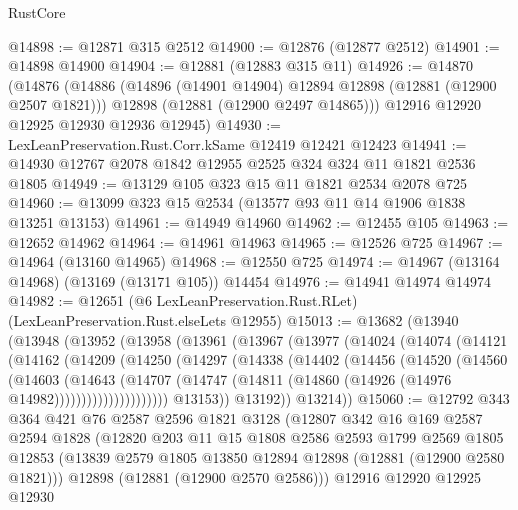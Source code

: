 \begin{lexlean}{RustCore}
\begin{coremodule}
@14898 := @12871 @315 @2512
@14900 := @12876 (@12877 @2512)
@14901 := @14898 @14900
@14904 := @12881 (@12883 @315 @11)
@14926 := @14870
    (@14876
      (@14886
        (@14896 (@14901 @14904) @12894 @12898 (@12881 (@12900 @2507 @1821)))
        @12898
        (@12881 (@12900 @2497 @14865)))
      @12916
      @12920
      @12925
      @12930
      @12936
      @12945)
@14930 := LexLeanPreservation.Rust.Corr.kSame @12419 @12421 @12423
@14941 := @14930 @12767 @2078 @1842 @12955 @2525 @324 @324 @11 @1821 @2536 @1805
@14949 := @13129 @105 @323 @15 @11 @1821 @2534 @2078 @725
@14960 := @13099 @323 @15 @2534 (@13577 @93 @11 @14 @1906 @1838 @13251 @13153)
@14961 := @14949 @14960
@14962 := @12455 @105
@14963 := @12652 @14962
@14964 := @14961 @14963
@14965 := @12526 @725
@14967 := @14964 (@13160 @14965)
@14968 := @12550 @725
@14974 := @14967 (@13164 @14968) (@13169 (@13171 @105)) @14454
@14976 := @14941 @14974 @14974
@14982 := @12651 (@6 LexLeanPreservation.Rust.RLet) (LexLeanPreservation.Rust.elseLets @12955)
@15013 := @13682
    (@13940
      (@13948
        (@13952
          (@13958
            (@13961
              (@13967
                (@13977
                  (@14024
                    (@14074
                      (@14121
                        (@14162
                          (@14209
                            (@14250
                              (@14297
                                (@14338
                                  (@14402
                                    (@14456
                                      (@14520
                                        (@14560
                                          (@14603
                                            (@14643
                                              (@14707
                                                (@14747
                                                  (@14811
                                                    (@14860
                                                      (@14926 (@14976 @14982)))))))))))))))))))))
                @13153))
            @13192))
        @13214))
@15060 := @12792
    @343
    @364
    @421
    @76
    @2587
    @2596
    @1821
    @3128
    (@12807
      @342
      @16
      @169
      @2587
      @2594
      @1828
      (@12820
        @203
        @11
        @15
        @1808
        @2586
        @2593
        @1799
        @2569
        @1805
        @12853
        (@13839 @2579 @1805 @13850 @12894 @12898 (@12881 (@12900 @2580 @1821)))
        @12898
        (@12881 (@12900 @2570 @2586)))
      @12916
      @12920
      @12925
      @12930

\end{coremodule}
\end{lexlean}
